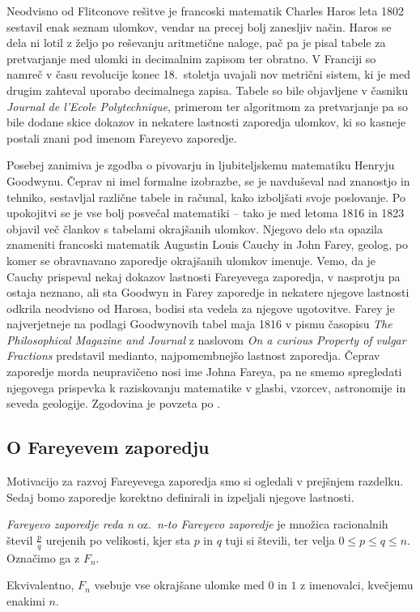 \documentclass[mat1]{fmfdelo}
\begin{document}
Neodvisno od Flitconove rešitve je francoski matematik Charles Haros leta 1802 sestavil enak seznam ulomkov, vendar na precej bolj zanesljiv način. Haros se dela ni lotil z željo po reševanju aritmetične naloge, pač pa je pisal tabele za pretvarjanje med ulomki in decimalnim zapisom ter obratno. V Franciji so namreč v času revolucije konec 18.~stoletja uvajali nov metrični sistem, ki je med drugim zahteval uporabo decimalnega zapisa. Tabele so bile objavljene v časniku \emph{Journal de l'Ecole Polytechnique}, primerom ter algoritmom za pretvarjanje pa so bile dodane skice dokazov in nekatere lastnosti zaporedja ulomkov, ki so kasneje postali znani pod imenom Fareyevo zaporedje. 

Posebej zanimiva je zgodba o pivovarju in ljubiteljskemu matematiku Henryju Goodwynu. Čeprav ni imel formalne izobrazbe, se je navduševal nad znanostjo in tehniko, sestavljal različne tabele in računal, kako izboljšati svoje poslovanje. Po upokojitvi se je vse bolj posvečal matematiki -- tako je med letoma 1816 in 1823 objavil več člankov s tabelami okrajšanih ulomkov. Njegovo delo sta opazila znameniti francoski matematik Augustin Louis Cauchy in John Farey, geolog, po komer se obravnavano zaporedje okrajšanih ulomkov imenuje. Vemo, da je Cauchy prispeval nekaj dokazov lastnosti Fareyevega zaporedja, v nasprotju pa ostaja neznano, ali sta Goodwyn in Farey zaporedje in nekatere njegove lastnosti odkrila neodvisno od Harosa, bodisi sta vedela za njegove ugotovitve. Farey je najverjetneje na podlagi Goodwynovih tabel maja 1816 v pismu časopisu \emph{The Philosophical Magazine and Journal} z naslovom \emph{On a curious Property of vulgar Fractions} predstavil medianto, najpomembnejšo lastnost zaporedja. Čeprav zaporedje morda neupravičeno nosi ime Johna Fareya, pa ne smemo spregledati njegovega prispevka k raziskovanju matematike v glasbi, vzorcev, astronomije in seveda geologije. Zgodovina je povzeta po \cite[poglavje 2]{motifofmath}.

%
\subsection{O Fareyevem zaporedju}

Motivacijo za razvoj Fareyevega zaporedja smo si ogledali v prejšnjem razdelku. Sedaj bomo zaporedje korektno definirali in izpeljali njegove lastnosti.

\begin{definicija}
\label{def:Farey}
\emph{Fareyevo zaporedje reda n} oz.\ \emph{n-to Fareyevo zaporedje} je množica racionalnih števil $\frac{p}{q}$ urejenih po velikosti, kjer sta $p$ in $q$ tuji si števili, ter velja $0 \leq p \leq q \leq n$. Označimo ga z $F_n$.

Ekvivalentno, $F_n$ vsebuje vse okrajšane ulomke med $0$ in $1$ z imenovalci, kvečjemu enakimi $n$.
\end{definicija}
\end{document}
